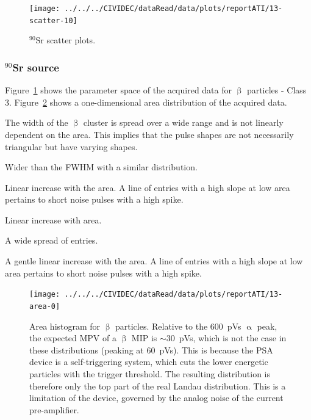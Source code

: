\clearpage
\begin{figure}[]
\centering
\texttt{[image: ../../../CIVIDEC/dataRead/data/plots/reportATI/13-scatter-10]}
\caption{$^{90}$Sr scatter plots.}
\label{fig:scattersr}
\end{figure}

\clearpage
\subsubsection{$^{90}$Sr source}
Figure~\ref{fig:scattersr} shows the parameter space of the acquired data for $\upbeta$ particles - Class 3. Figure~\ref{fig:1dsrarea} shows a one-dimensional area distribution of the acquired data. 
\begin{description}
\setlength\itemsep{-0.3em}
\item[Width: ] The width of the $\upbeta$ cluster is spread over a wide range and is not linearly dependent on the area. This implies that the pulse shapes are not necessarily triangular but have varying shapes.
\item[Base width: ] Wider than the FWHM with a similar distribution.
\item[Amplitude: ] Linear increase with the area. A line of entries with a high slope at low area pertains to short noise pulses with a high spike.
\item[Calculated area: ] Linear increase with area.
\item[Base width -- width: ] A wide spread of entries.
\item[Slope: ] A gentle linear increase with the area. A line of entries with a high slope at low area pertains to short noise pulses with a high spike.
\end{description}


\begin{figure}[]
\centering
\texttt{[image: ../../../CIVIDEC/dataRead/data/plots/reportATI/13-area-0]}
\caption{Area histogram for $\upbeta$ particles. Relative to the 600~pVs $\upalpha$ peak, the expected MPV of a $\upbeta$ MIP is $\sim$30~pVs, which is not the case in these distributions (peaking at 60~pVs). This is because the PSA device is a self-triggering system, which cuts the lower energetic particles with the trigger threshold. The resulting distribution is therefore only the top part of the real Landau distribution. This is a limitation of the device, governed by the analog noise of the current pre-amplifier.}
\label{fig:1dsrarea}
\end{figure} 
 
